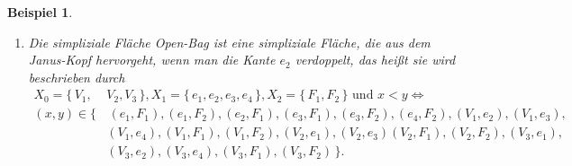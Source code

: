 \documentclass[12pt,titlepage]{article}
\newtheorem{bsp}{Beispiel}[section]
\begin{document}
\begin{bsp}
\begin{enumerate}
\begin{figure}[H]
\begin{tikzpicture}[line cap=round,line join=round,>=triangle 45,x=1.0cm,y=1.0cm]
\end{tikzpicture}
\caption{Janus-Kopf}
\end{figure}
 \item 
 Die simpliziale Fläche \emph{Open-Bag} ist eine simpliziale Fläche, die aus dem \emph{Janus-Kopf} hervorgeht, wenn man die Kante $e_{2}$ verdoppelt, das heißt sie wird beschrieben durch
 \begin{align*}
  X_{0}=\{\,V_{1},&V_{2},V_{3}\,\},X_{1}=\{\,e_{1},e_{2},e_{3},e_{4} \,\}, X_{2}=\{\,F_{1},F_{2}\,\} \text{ und } x<y \Leftrightarrow\\
 (x,y)\in\{&\,(e_{1},F_{1}),(e_{1},F_{2}),(e_{2},F_{1}),(e_{3},F_{1}),(e_{3},F_{2}),(e_{4},F_{2}),(V_{1},e_{2}),(V_{1},e_{3}),\\ &(V_{1},e_{4}),
  (V_{1},F_{1}),(V_{1},F_{2}),(V_{2},e_{1}),(V_{2},e_{3})
 (V_{2},F_{1}), (V_{2},F_{2}), (V_{3},e_{1}),\\&(V_{3},e_{2}),(V_{3},e_{4}),(V_{3},F_{1}),(V_3,F_2) \,\}.
 \end{align*}
 \end{enumerate}
\begin{figure}[H]
\begin{tikzpicture}[line cap=round,line join=round,>=triangle 45,x=1.0cm,y=1.0cm]


\end{tikzpicture}
\end{figure}
\end{bsp}
\end{document}
